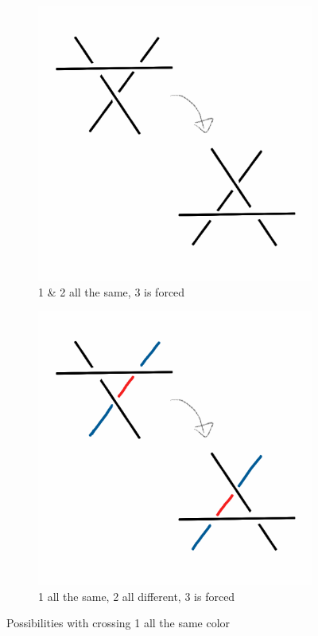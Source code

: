 \documentclass[12pt,letterpaper]{article}
\theoremstyle{definition}
\begin{document}
\begin{figure}[h!]
    \centering
    \begin{subfigure}{.4\textwidth}
        \centering
        \includegraphics[width=\textwidth]{meeting10pics/1s2s.png}
        \caption{1 \& 2 all the same, 3 is forced}
    \end{subfigure}
    \qquad
    \begin{subfigure}{.4\textwidth}
        \centering
        \includegraphics[width=\textwidth]{meeting10pics/1s2d.png}
        \caption{1 all the same, 2 all different, 3 is forced}
    \end{subfigure}
    \caption{Possibilities with crossing 1 all the same color}
\end{figure}
\end{document}
